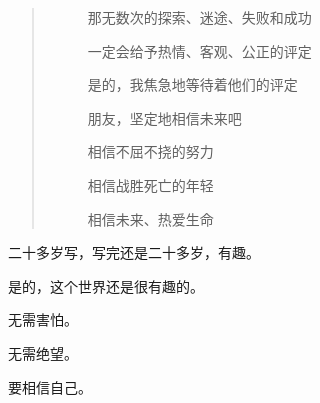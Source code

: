 \begin{multicols}{\theparacolNo}
\begin{quote}
\begin{spacing}{0.5}
{{\begin{description}
					\item[\textcolor{Gray}{\faQuoteRight}] 那无数次的探索、迷途、失败和成功
					\item[\textcolor{Gray}{\faQuoteRight}] 一定会给予热情、客观、公正的评定
					\item[\textcolor{Gray}{\faQuoteRight}] 是的，我焦急地等待着他们的评定
					\item[\textcolor{Gray}{\faQuoteRight}] 朋友，坚定地相信未来吧
					\item[\textcolor{Gray}{\faQuoteRight}] 相信不屈不挠的努力
					\item[\textcolor{Gray}{\faQuoteRight}] 相信战胜死亡的年轻
					\item[\textcolor{Gray}{\faQuoteRight}] 相信未来、热爱生命
				\end{description}
		}}
	\end{spacing}
\end{quote}

二十多岁写，写完还是二十多岁，有趣。

是的，这个世界还是很有趣的。

无需害怕。

无需绝望。

要相信自己。
\ifnum{}
	\end{multicols}
\fi
